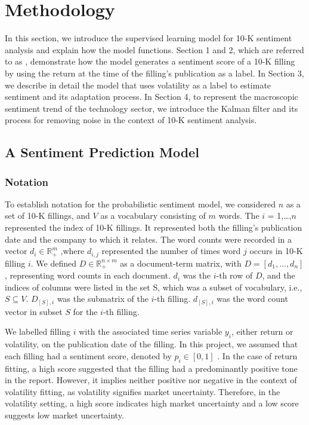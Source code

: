 \documentclass[logo,bsc,singlespacing,parskip]{infthesis}
\begin{document}
\chapter{Methodology}
In this section, we introduce the supervised learning model for 10-K sentiment analysis and explain how the model functions. Section 1 and 2, which are referred to as \cite{ke2020predicting}, demonstrate how the model generates a sentiment score of a 10-K filling by using the return at the time of the filling’s publication as a label. In Section 3, we describe in detail the model that uses volatility as a label to estimate sentiment and its adaptation process. In Section 4, to represent the macroscopic sentiment trend of the technology sector, we introduce the Kalman filter and its process for removing noise in the context of 10-K sentiment analysis. 

\section{A Sentiment Prediction Model}

\subsection{Notation}
To establish notation for the probabilistic sentiment model, we considered $n$ as a set of 10-K fillings, and $V$ as a vocabulary consisting of $m$ words. The $i$ = 1,…,$n$ represented the index of 10-K fillings. It represented both the filling’s publication date and the company to which it relates. The word counts were recorded in a vector $d_i \in \mathbb{R}^m_+$
 ,where $d_{i,j}$ represented the number of times word $j$ occurs in 10-K filling $i$. We defined $D \in \mathbb{R}^{n \times m}_+$ as a document-term matrix, with $D = [d_1, ..., d_n]$, representing word counts in each document. $d_i$ was the  $i$-th row of $D$, and the indices of columns were listed in the set S, which was a subset of vocabulary, i.e., $S \subseteq V$. $D_{[S],i}$ was the submatrix of the $i$-th filling. $d_{[S],i}$ was the word count vector in subset $S$ for the $i$-th filling.

We labelled filling $i$ with the associated time series variable $y_i$, either return or volatility, on the publication date of the filling. In this project, we assumed that each filling had a sentiment score, denoted by $p_i \in [0,1]$
. In the case of return fitting, a high score suggested that the filling had a predominantly positive tone in the report. However, it implies neither positive nor negative in the context of volatility fitting, as volatility signifies market uncertainty. Therefore, in the volatility setting, a high score indicates high market uncertainty and a low score suggests low market uncertainty.
\end{document}
